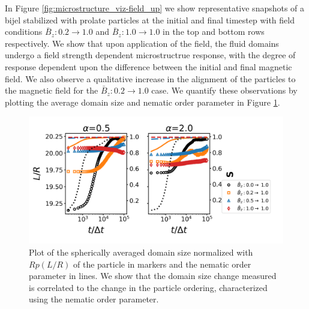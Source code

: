 In Figure \ref{fig:microstructure_viz-field_up} we show representative
snapshots of a bijel stabilized with prolate particles at the initial
and final timestep with field conditions
\(\bar{B}_z: 0.2 \rightarrow 1.0\) and
\(\bar{B}_z: 1.0 \rightarrow 1.0\) in the top and bottom rows
respectively. We show that upon application of the field, the fluid
domains undergo a field strength dependent microstructrue response, with
the degree of response dependent upon the difference between the initial
and final magnetic field. We also observe a qualitative increase in the
alignment of the particles to the magnetic field for the
\(\bar{B}_z: 0.2 \rightarrow 1.0\) case. We quantify these observations
by plotting the average domain size and nematic order parameter in
Figure \ref{fig:domain_size-field_up}.

\begin{figure} 
\centering 
\includegraphics[scale=0.5]{../figures/results/paper2/domain_size-field_up.png} 
\caption{Plot of the spherically averaged domain size normalized with $Rp(L/R)$ of the particle in markers and the nematic order parameter in lines. We show that the domain size change measured is correlated to the change in the particle ordering, characterized using the nematic order parameter.} 
\label{fig:domain_size-field_up} 
\end{figure}

